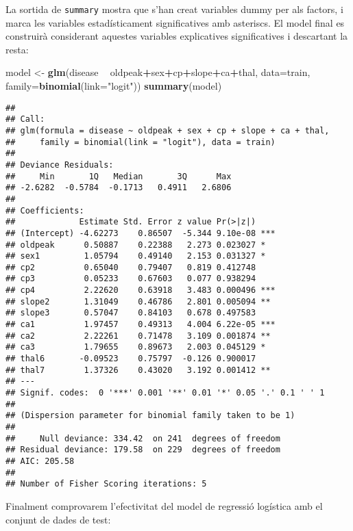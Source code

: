 \documentclass[12,]{article}
\newenvironment{Shaded}{\begin{snugshade}}{\end{snugshade}}
\newcommand{\DataTypeTok}[1]{\textcolor[rgb]{0.13,0.29,0.53}{#1}}
\newcommand{\KeywordTok}[1]{\textcolor[rgb]{0.13,0.29,0.53}{\textbf{#1}}}
\newcommand{\NormalTok}[1]{#1}
\newcommand{\OperatorTok}[1]{\textcolor[rgb]{0.81,0.36,0.00}{\textbf{#1}}}
\newcommand{\StringTok}[1]{\textcolor[rgb]{0.31,0.60,0.02}{#1}}
\begin{document}
La sortida de \texttt{summary} mostra que s'han creat variables dummy
per als factors, i marca les variables estadísticament significatives
amb asteriscs. El model final es construirà considerant aquestes
variables explicatives significatives i descartant la resta:

\begin{Shaded}
\begin{Highlighting}[]
\NormalTok{model <-}\StringTok{ }\KeywordTok{glm}\NormalTok{(disease }\OperatorTok{~}\StringTok{ }\NormalTok{oldpeak}\OperatorTok{+}\NormalTok{sex}\OperatorTok{+}\NormalTok{cp}\OperatorTok{+}\NormalTok{slope}\OperatorTok{+}\NormalTok{ca}\OperatorTok{+}\NormalTok{thal,}
             \DataTypeTok{data=}\NormalTok{train, }\DataTypeTok{family=}\KeywordTok{binomial}\NormalTok{(}\DataTypeTok{link=}\StringTok{"logit"}\NormalTok{))}
\KeywordTok{summary}\NormalTok{(model)}
\end{Highlighting}
\end{Shaded}

\begin{verbatim}
## 
## Call:
## glm(formula = disease ~ oldpeak + sex + cp + slope + ca + thal, 
##     family = binomial(link = "logit"), data = train)
## 
## Deviance Residuals: 
##     Min       1Q   Median       3Q      Max  
## -2.6282  -0.5784  -0.1713   0.4911   2.6806  
## 
## Coefficients:
##             Estimate Std. Error z value Pr(>|z|)    
## (Intercept) -4.62273    0.86507  -5.344 9.10e-08 ***
## oldpeak      0.50887    0.22388   2.273 0.023027 *  
## sex1         1.05794    0.49140   2.153 0.031327 *  
## cp2          0.65040    0.79407   0.819 0.412748    
## cp3          0.05233    0.67603   0.077 0.938294    
## cp4          2.22620    0.63918   3.483 0.000496 ***
## slope2       1.31049    0.46786   2.801 0.005094 ** 
## slope3       0.57047    0.84103   0.678 0.497583    
## ca1          1.97457    0.49313   4.004 6.22e-05 ***
## ca2          2.22261    0.71478   3.109 0.001874 ** 
## ca3          1.79655    0.89673   2.003 0.045129 *  
## thal6       -0.09523    0.75797  -0.126 0.900017    
## thal7        1.37326    0.43020   3.192 0.001412 ** 
## ---
## Signif. codes:  0 '***' 0.001 '**' 0.01 '*' 0.05 '.' 0.1 ' ' 1
## 
## (Dispersion parameter for binomial family taken to be 1)
## 
##     Null deviance: 334.42  on 241  degrees of freedom
## Residual deviance: 179.58  on 229  degrees of freedom
## AIC: 205.58
## 
## Number of Fisher Scoring iterations: 5
\end{verbatim}

Finalment comprovarem l'efectivitat del model de regressió logística amb
el conjunt de dades de test:
\end{document}
